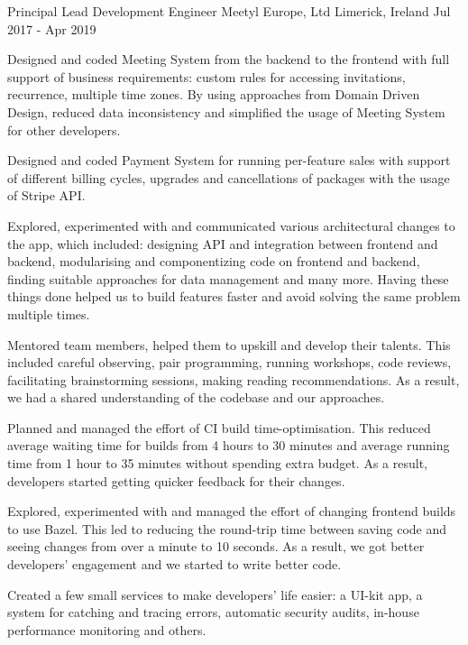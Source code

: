 

\begin{cventries}

  \cventry
    {Principal Lead Development Engineer} %
    {Meetyl Europe, Ltd} %
    {Limerick, Ireland} %
    {Jul 2017 - Apr 2019} %
    {
      \begin{cvitems} %
        \item {Designed and coded Meeting System from the backend to the frontend with full support of business requirements: custom rules for accessing invitations, recurrence, multiple time zones. By using approaches from Domain Driven Design, reduced data inconsistency and simplified the usage of Meeting System for other developers.}
        \item {Designed and coded Payment System for running per-feature sales with support of different billing cycles, upgrades and cancellations of packages with the usage of Stripe API.}
        \item {Explored, experimented with and communicated various architectural changes to the app, which included: designing API and integration between frontend and backend, modularising and componentizing code on frontend and backend, finding suitable approaches for data management and many more. Having these things done helped us to build features faster and avoid solving the same problem multiple times.}
        \item {Mentored team members, helped them to upskill and develop their talents. This included careful observing, pair programming, running workshops, code reviews, facilitating brainstorming sessions, making reading recommendations. As a result, we had a shared understanding of the codebase and our approaches.}
        \item {Planned and managed the effort of CI build time-optimisation. This reduced average waiting time for builds from 4 hours to 30 minutes and average running time from 1 hour to 35 minutes without spending extra budget. As a result, developers started getting quicker feedback for their changes.}
        \item {Explored, experimented with and managed the effort of changing frontend builds to use Bazel. This led to reducing the round-trip time between saving code and seeing changes from over a minute to 10 seconds. As a result, we got better developers’ engagement and we started to write better code.}
        \item {Created a few small services to make developers' life easier: a UI-kit app, a system for catching and tracing errors, automatic security audits, in-house performance monitoring and others.}
      \end{cvitems}
    }


\end{cventries}
